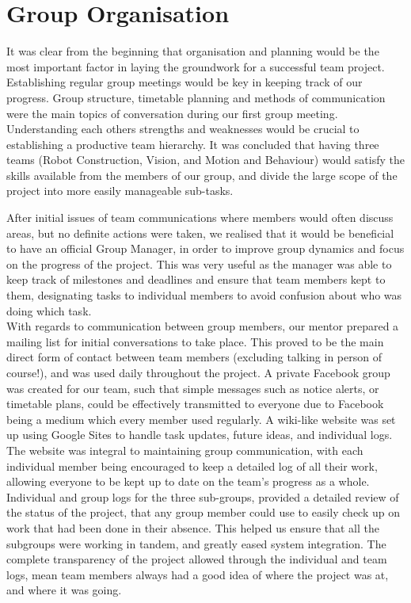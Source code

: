 \section{Group Organisation}

It was clear from the beginning that organisation and planning would be the most important factor in laying the groundwork for a successful team project. Establishing regular group meetings would be key in keeping track of our progress. Group structure, timetable planning and methods of communication were the main topics of conversation during our first group meeting. Understanding each others strengths and weaknesses would be crucial to establishing a productive team hierarchy. It was concluded that having three teams (Robot Construction, Vision, and Motion and Behaviour) would satisfy the skills available from the members of our group, and divide the large scope of the project into more easily manageable sub-tasks. \linebreak

After initial issues of team communications where members would often discuss areas, but no definite actions were taken, we realised that it would be beneficial to have an official Group Manager, in order to improve group dynamics and focus on the progress of the project. This was very useful as the manager was able to keep track of milestones and deadlines and ensure that team members kept to them, designating tasks to individual members to avoid confusion about who was doing which task.\\

With regards to communication between group members, our mentor prepared a mailing list for initial conversations to take place. This proved to be the main direct form of contact between team members (excluding talking in person of course!), and was used daily throughout the project. A private Facebook group was created for our team, such that simple messages such as notice alerts, or timetable plans, could be effectively transmitted to everyone due to Facebook being a medium which every member used regularly. A wiki-like website was set up using Google Sites to handle task updates, future ideas, and individual logs. The website was integral to maintaining group communication, with each individual member being encouraged to keep a detailed log of all their work, allowing everyone to be kept up to date on the team's progress as a whole. Individual and group logs for the three sub-groups, provided a detailed review of the status of the project, that any group member could use to easily check up on work that had been done in their absence. This helped us ensure that all the subgroups were working in tandem, and greatly eased system integration. The complete transparency of the project allowed through the individual and team logs, mean team members always had a good idea of where the project was at, and where it was going. \linebreak

